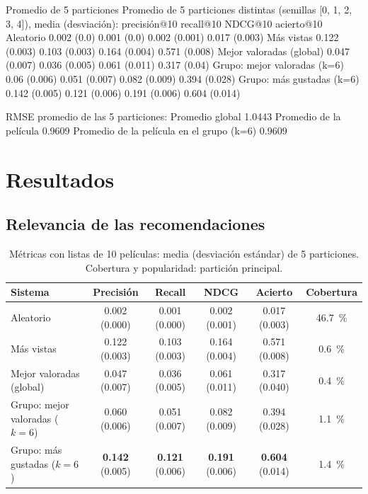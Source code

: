 \documentclass[11pt,letterpaper]{article}
\begin{document}
\begin{consola}[label=out:rep]{Promedio de 5 particiones}
Promedio de 5 particiones distintas (semillas [0, 1, 2, 3, 4]), media (desviación):
                               precisión@10      recall@10        NDCG@10     acierto@10
Aleatorio                       0.002 (0.0)    0.001 (0.0)  0.002 (0.001)  0.017 (0.003)
Más vistas                    0.122 (0.003)  0.103 (0.003)  0.164 (0.004)  0.571 (0.008)
Mejor valoradas (global)      0.047 (0.007)  0.036 (0.005)  0.061 (0.011)   0.317 (0.04)
Grupo: mejor valoradas (k=6)   0.06 (0.006)  0.051 (0.007)  0.082 (0.009)  0.394 (0.028)
Grupo: más gustadas (k=6)     0.142 (0.005)  0.121 (0.006)  0.191 (0.006)  0.604 (0.014)

RMSE promedio de las 5 particiones:
Promedio global                              1.0443
Promedio de la película                      0.9609
Promedio de la película en el grupo (k=6)    0.9609
\end{consola}

\newpage
\section{Resultados}

\subsection{Relevancia de las recomendaciones}

\begin{table}[H]
\centering
\caption{Métricas con listas de 10 películas: media (desviación estándar) de 5 particiones. Cobertura y popularidad: partición principal.}
\label{tab:res}
\begin{tabular}{lccccc}
\toprule
\textbf{Sistema} & \textbf{Precisión} & \textbf{Recall} & \textbf{NDCG} & \textbf{Acierto} & \textbf{Cobertura} \\
\midrule
Aleatorio                        & 0.002 (0.000) & 0.001 (0.000) & 0.002 (0.001) & 0.017 (0.003) & 46.7~\% \\
Más vistas                       & 0.122 (0.003) & 0.103 (0.003) & 0.164 (0.004) & 0.571 (0.008) & 0.6~\% \\
Mejor valoradas (global)         & 0.047 (0.007) & 0.036 (0.005) & 0.061 (0.011) & 0.317 (0.040) & 0.4~\% \\
Grupo: mejor valoradas ($k=6$)   & 0.060 (0.006) & 0.051 (0.007) & 0.082 (0.009) & 0.394 (0.028) & 1.1~\% \\
Grupo: más gustadas ($k=6$)      & \textbf{0.142} (0.005) & \textbf{0.121} (0.006) & \textbf{0.191} (0.006) & \textbf{0.604} (0.014) & 1.4~\% \\
\bottomrule
\end{tabular}
\end{table}
\end{document}
